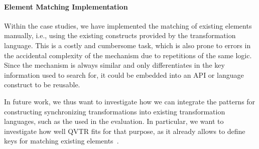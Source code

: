 
\paragraph{Element Matching Implementation}
Within the case studies, we have implemented the matching of existing elements manually, i.e., using the existing constructs provided by the transformation language.
This is a costly and cumbersome task, which is also prone to errors in the accidental complexity of the mechanism due to repetitions of the same logic.
Since the mechanism is always similar and only differentiates in the key information used to search for, it could be embedded into an API or language construct to be reusable.

In future work, we thus want to investigate how we can integrate the patterns for constructing synchronizing transformations into existing transformation languages, such as the \reactionslanguage used in the evaluation.
In particular, we want to investigate how well \gls{QVTR} fits for that purpose, as it already allows to define keys for matching existing elements~\cite[7.10.2.]{qvt}. %

